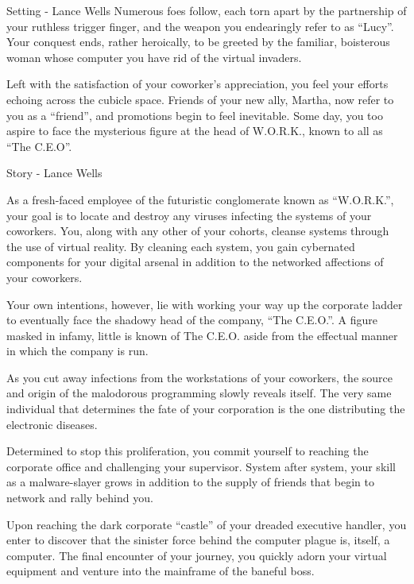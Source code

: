 \documentclass[12pt]{report}
\begin{document}
\begin{section}{Setting - Lance Wells}
Numerous foes follow, each torn apart by the partnership of your ruthless trigger finger, 
and the weapon you endearingly refer to as ``Lucy''. Your conquest ends, rather heroically, 
to be greeted by the familiar, boisterous woman whose computer you have rid of the virtual 
invaders.

Left with the satisfaction of your coworker's appreciation, you feel your efforts echoing 
across the cubicle space. Friends of your new ally, Martha, now refer to you as a ``friend'', 
and promotions begin to feel inevitable. Some day, you too aspire to face the mysterious 
figure at the head of W.O.R.K., known to all as ``The C.E.O''.


\end{section}

\begin{section}{Story - Lance Wells}

\hspace{1.5em}As a fresh-faced employee of the futuristic conglomerate known as ``W.O.R.K.'', 
your goal is to locate and destroy any viruses infecting the systems of your coworkers. You, 
along with any other of your cohorts, cleanse systems through the use of virtual reality. By 
cleaning each system, you gain cybernated components for your digital arsenal in addition to 
the networked affections of your coworkers.

Your own intentions, however, lie with working your way up the corporate ladder to eventually 
face the shadowy head of the company, ``The C.E.O.''. A figure masked in infamy, little is 
known of The C.E.O. aside from the effectual manner in which the company is run.

As you cut away infections from the workstations of your coworkers, the source and origin of 
the malodorous programming slowly reveals itself. The very same individual that determines the 
fate of your corporation is the one distributing the electronic diseases.
\newline

Determined to stop this proliferation, you commit yourself to reaching the corporate office 
and challenging your supervisor. System after system, your skill as a malware-slayer grows 
in addition to the supply of friends that begin to network and rally behind you.

Upon reaching the dark corporate ``castle'' of your dreaded executive handler, you enter to 
discover that the sinister force behind the computer plague is, itself, a computer. The final 
encounter of your journey, you quickly adorn your virtual equipment and venture into the 
mainframe of the baneful boss.


\end{section}
\end{document}
